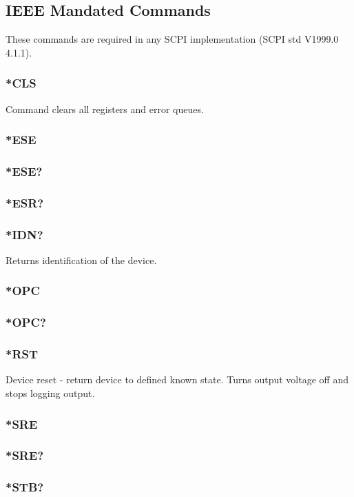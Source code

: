 \documentclass[a4paper,10pt]{article}
\begin{document}
\subsection{IEEE Mandated Commands}
    These commands are required in any SCPI implementation (SCPI std V1999.0 4.1.1).
    
    \hypertarget{cls}{}
    \subsubsection{*CLS}
        Command clears all registers and error queues.
    \subsubsection{*ESE}
    \subsubsection{*ESE?}
    \subsubsection{*ESR?}
    \subsubsection{*IDN?}
        Returns identification of the device.
    \subsubsection{*OPC}
    \subsubsection{*OPC?}
    \subsubsection{*RST}
        Device reset - return device to defined known state. Turns output voltage off and stops logging output.
    \subsubsection{*SRE}
    \subsubsection{*SRE?}
    \subsubsection{*STB?}
\end{document}
